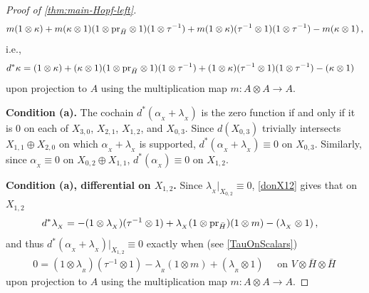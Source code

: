 \documentclass[11pt]{amsart}
\numberwithin{equation}{section}
\newcommand{\X}{_X}
\newcommand{\alphax}{\alpha_{\X}}
\newcommand{\lambdax}{\lambda_{\X}}
\newcommand{\gammax}{\kappa} %
\newcommand{\pr}{ {\rm{pr}} }%
\newcommand{\itau}{{\tau^{-1}}}%
\renewcommand{\_}[1]{\mbox{$_{\left( #1 \right)}$}}
\newcommand{\ot}{\otimes}
\begin{document}
{\begin{proof}[Proof of \cref{thm:main-Hopf-left}]
\begin{equation*}
\begin{aligned}
m(1\ot \gammax) + m(\gammax\ot 1) (1\ot \pr_{\bar
  H}\ot 1)
(1\ot \itau)
+
m(1\ot \gammax)(\itau\ot 1 )(1\ot \itau) - m(\gammax \ot 1)\, ,
\end{aligned}
\end{equation*}
i.e.,
\begin{equation}
\begin{aligned}\label{donX21}
d^*\gammax
&= (1\ot \gammax) + (\gammax \ot 1) (1\ot \pr_{\bar H}\ot 1)
(1\ot \itau) +
(1\ot \gammax)(\itau\ot 1 )(1\ot \itau) - (\gammax \ot 1)
\end{aligned}
\end{equation}
upon projection to $A$ using the multiplication map
 $m:A\ot A\rightarrow A$.

{\bf Condition (a).}
%
The cochain $d^*(\alphax+\lambdax)$ 
is the zero function 
if and only if it is 0 on each of $X_{3,0}$, $X_{2,1}$, $X_{1,2}$, and 
$X_{0,3}$.
Since $d(X_{0,3})$
trivially intersects $X_{1,1}\oplus X_{2,0}$ on which
$\alphax +\lambdax$ is supported, $d^*(\alphax +\lambdax)\equiv 0$ on $X_{0,3}$.
Similarly, since $\alphax\equiv 0$ on $X_{0,2}\oplus X_{1,1}$,
$d^*(\alphax)\equiv 0$ on $X_{1,2}$.

{\bf Condition (a), differential on $X_{1,2}$.}
Since $\lambdax|_{X_{0,2}}\equiv 0$, \cref{donX12} gives that
on $X_{1,2}$
$$
\begin{aligned}
  d^* \lambdax 
  & =
  -(1\ot \lambdax)(\itau\ot 1)+\lambdax (1\ot \pr_{\bar H})
  (1\ot m)-(\lambdax\ot 1)
\, ,
\end{aligned}
$$
and thus
$d^*(\alphax+\lambdax)|_{X_{1,2}}\equiv 0$ exactly when
(see \cref{TauOnScalars})
\begin{equation}\label{SwitchSides}
\begin{aligned}
  0=(1\ot \lambda_{_R})(\itau\ot 1)
  -
  \lambda_{_R}(1\ot m)+(\lambda_{_R}\ot 1)
\quad\text{ on } V\ot \bar H\ot \bar H 
\,
\end{aligned}
\end{equation}
upon projection to $A$ using the multiplication map $m:A\ot 
A\rightarrow A$.


\end{proof}}
\end{document}
